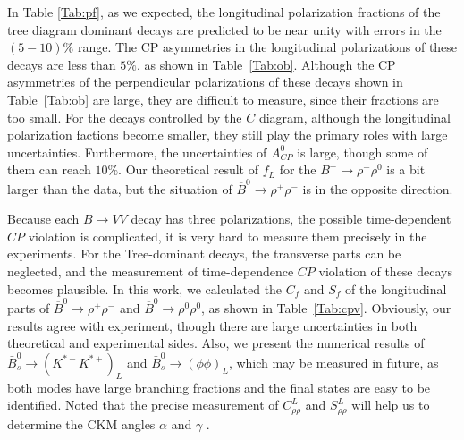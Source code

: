 \documentclass[11pt]{article}
\begin{document}
In Table \ref{Tab:pf}, as we expected, the longitudinal polarization fractions of the  tree diagram dominant  decays are predicted to be near unity with errors in the $(5-10)\%$ range. The CP asymmetries in the longitudinal polarizations of these decays are less than $5\%$, as shown in Table~\ref{Tab:ob}. Although the CP asymmetries of the perpendicular polarizations of these decays shown in Table~\ref{Tab:ob} are large, they are difficult to measure, since their fractions are too small.  For the decays controlled by the $C$ diagram, although the longitudinal polarization factions become smaller, they still play the primary roles with large uncertainties. Furthermore, the uncertainties of $A^0_{CP}$ is large, though some of them can reach $10\%$. Our  theoretical result of $f_L$  for the $B^-\to \rho^-\rho^0$  is a bit larger than the data, but the situation of $\overline B ^0 \to \rho^+\rho^-$ is in the opposite direction.


Because each $B \to VV$ decay  has three polarizations, the possible time-dependent $CP$ violation is complicated,  it is very hard to measure them precisely in the experiments. For the Tree-dominant decays, the transverse parts can be neglected, and the measurement of time-dependence $CP$ violation of these decays becomes plausible. In this work, we calculated the $C_{f}$ and $S_{f}$ of the longitudinal parts of $\overline B^0 \to \rho^+\rho^-$ and $\overline B^0 \to \rho^0\rho^0$, as shown in Table~\ref{Tab:cpv}. Obviously, our results agree with experiment, though there are large uncertainties in both theoretical and experimental sides. Also, we present the numerical results of $ \bar B^{0}_s \to (K^{\ast -} K^{\ast +})_L$ and $ \bar B^{0}_s \to(\phi \phi)_L$, which may be measured in future, as both modes have large branching fractions and the final states are easy to be identified. Noted that the precise measurement of $C_{\rho\rho}^L$ and $S_{\rho\rho}^L$ will help us to determine the CKM angles $\alpha$ and $\gamma$ \cite{Beneke:2006rb}.
\end{document}
